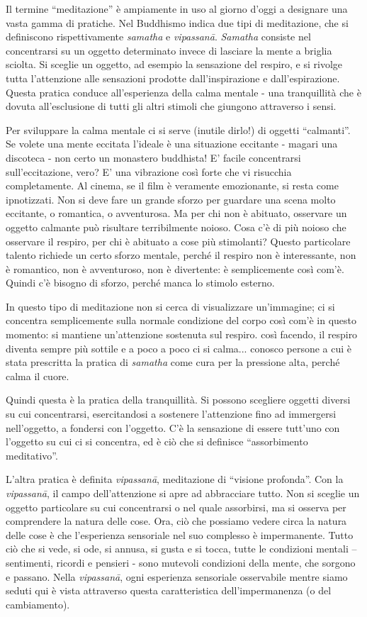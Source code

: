 
Il termine ``meditazione'' è ampiamente in uso al giorno d'oggi a
designare una vasta gamma di pratiche. Nel Buddhismo indica due tipi di
meditazione, che si definiscono rispettivamente \textit{samatha} e \textit{vipassanā}.
\textit{Samatha} consiste nel concentrarsi su un oggetto determinato invece di
lasciare la mente a briglia sciolta. Si sceglie un oggetto, ad esempio
la sensazione del respiro, e si rivolge tutta l'attenzione alle
sensazioni prodotte dall'inspirazione e dall'espirazione. Questa pratica
conduce all'esperienza della calma mentale - una tranquillità che è
dovuta all'esclusione di tutti gli altri stimoli che giungono attraverso
i sensi.

Per sviluppare la calma mentale ci si serve (inutile dirlo!) di oggetti
``calmanti''. Se volete una mente eccitata l'ideale è una situazione
eccitante - magari una discoteca - non certo un monastero buddhista! E'
facile concentrarsi sull'eccitazione, vero? E' una vibrazione così forte
che vi risucchia completamente. Al cinema, se il film è veramente
emozionante, si resta come ipnotizzati. Non si deve fare un grande
sforzo per guardare una scena molto eccitante, o romantica, o
avventurosa. Ma per chi non è abituato, osservare un oggetto calmante
può risultare terribilmente noioso. Cosa c'è di più noioso che osservare
il respiro, per chi è abituato a cose più stimolanti? Questo particolare
talento richiede un certo sforzo mentale, perché il respiro non è
interessante, non è romantico, non è avventuroso, non è divertente: è
semplicemente così com'è. Quindi c'è bisogno di sforzo, perché manca lo
stimolo esterno.

In questo tipo di meditazione non si cerca di visualizzare un'immagine;
ci si concentra semplicemente sulla normale condizione del corpo così
com'è in questo momento: si mantiene un'attenzione sostenuta sul
respiro. così facendo, il respiro diventa sempre più sottile e a poco a
poco ci si calma... conosco persone a cui è stata prescritta la pratica
di \textit{samatha} come cura per la pressione alta, perché calma il cuore.

Quindi questa è la pratica della tranquillità. Si possono scegliere
oggetti diversi su cui concentrarsi, esercitandosi a sostenere
l'attenzione fino ad immergersi nell'oggetto, a fondersi con l'oggetto.
C'è la sensazione di essere tutt'uno con l'oggetto su cui ci si
concentra, ed è ciò che si definisce ``assorbimento meditativo''.

L'altra pratica è definita \textit{vipassanā}, meditazione di ``visione profonda''.
Con la \textit{vipassanā}, il campo dell'attenzione si apre ad abbracciare tutto.
Non si sceglie un oggetto particolare su cui concentrarsi o nel quale
assorbirsi, ma si osserva per comprendere la natura delle cose. Ora, ciò
che possiamo vedere circa la natura delle cose è che l'esperienza
sensoriale nel suo complesso è impermanente. Tutto ciò che si vede, si
ode, si annusa, si gusta e si tocca, tutte le condizioni mentali –
sentimenti, ricordi e pensieri - sono mutevoli condizioni della mente,
che sorgono e passano. Nella \textit{vipassanā}, ogni esperienza sensoriale
osservabile mentre siamo seduti qui è vista attraverso questa
caratteristica dell'impermanenza (o del cambiamento).

